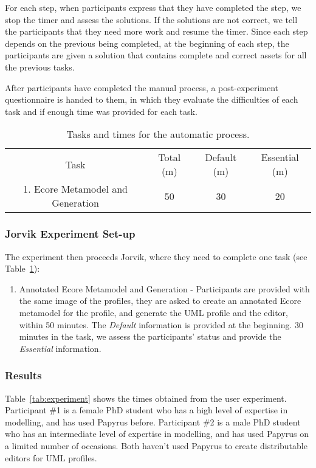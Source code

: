 For each step, when participants express that they have completed the step, we stop the timer and assess the solutions. 
If the solutions are not correct, we tell the participants that they need more work and resume the timer.
Since each step depends on the previous being completed, at the beginning of each step, the participants are given a solution that contains complete and correct assets for all the previous tasks.

After participants have completed the manual process, a post-experiment questionnaire is handed to them, in which they evaluate the difficulties of each task and if enough time was provided for each task.

\begin{table}[ht!]
	\centering
	\setlength{\tabcolsep}{3.5pt} 
	\begin{tabular}{|c|c|c|c|}
		Task & Total (m) & Default (m) & Essential (m) \\ 
		1. Ecore Metamodel and Generation & 50 & 30 & 20 \\
	\end{tabular}
	\label{tab:automatic}
	\caption{Tasks and times for the automatic process.}
\end{table}

\subsubsection{Jorvik Experiment Set-up}
The experiment then proceeds Jorvik, where they need to complete one task (see Table~\ref{tab:automatic}):
\begin{enumerate}
	\item Annotated Ecore Metamodel and Generation - Participants are provided with the same image of the profiles, they are asked to create an annotated Ecore metamodel for the profile, and generate the UML profile and the editor, within 50 minutes.
	The \textit{Default} information is provided at the beginning. 
	30 minutes in the task, we assess the participants' status and provide the \textit{Essential} information.
\end{enumerate}

\subsubsection{Results}
Table~\ref{tab:experiment} shows the times obtained from the user experiment.
Participant \#1 is a female PhD student who has a high level of expertise in modelling, and has used Papyrus before.
Participant \#2 is a male PhD student who has an intermediate level of expertise in modelling, and has used Papyrus on a limited number of occasions. Both haven't used Papyrus to create distributable editors for UML profiles.

